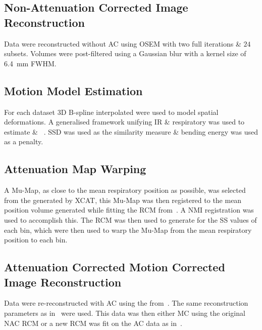     \vspace{-0.5cm}
    
    \subsection{Non-Attenuation Corrected Image Reconstruction} \label{sec:non-attenuation_corrected_image_reconstruction}
        Data were reconstructed without \gls{AC} using \gls{OSEM} with two full iterations \& $24$ subsets.%
        Volumes were post-filtered using a Gaussian blur with a kernel size of \SI{6.4}{\milli\metre} \gls{FWHM}.
    
    \vspace{-0.5cm}
    
    \subsection{Motion Model Estimation} \label{sec:motion_model_estimation}
        For each dataset \gls{3D} B-spline interpolated  were used to model spatial deformations. A generalised framework unifying \gls{IR} \& respiratory  was used to estimate  \& ~\cite{McClelland2017}. \gls{SSD} was used as the similarity measure \& bending energy was used as a penalty.%
    
    \vspace{-0.5cm}
    
    \subsection{Attenuation Map Warping} \label{sec:attenuation_map_warping}
        A \gls{Mu-Map}, as close to the mean respiratory position as possible, was selected from the  generated by \gls{XCAT}, this \gls{Mu-Map} was then registered to the mean position volume generated while fitting the \gls{RCM} from~. A \gls{NMI} registration was used to accomplish this.%
        The \gls{RCM} was then used to generate  for the \gls{SS} values of each bin, which were then used to warp the \gls{Mu-Map} from the mean respiratory position to each bin.
    
    \vspace{-0.5cm}
    
    \subsection{Attenuation Corrected Motion Corrected Image Reconstruction} \label{sec:attenuation_corrected_image_reconstruction}
        Data were re-reconstructed with \gls{AC} using the  from~. The same reconstruction parameters as in~ were used. This data was then either \gls{MC} using the original \gls{NAC} \gls{RCM} or a new \gls{RCM} was fit on the \gls{AC} data as in~.
    
